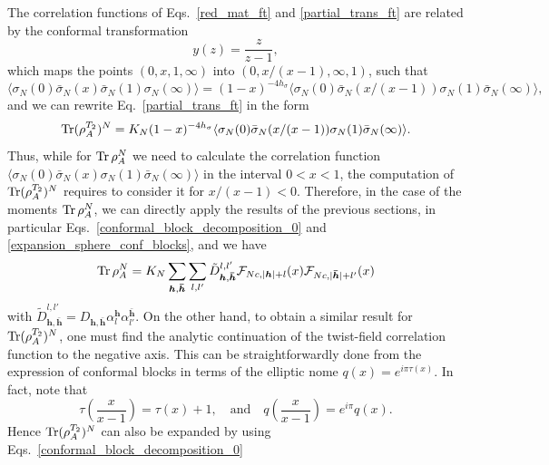 \documentclass[a4paper,11pt]{article}
\def\Tr{\mathop{\mbox{\normalfont Tr}}\nolimits}
\begin{document}
The correlation functions of Eqs.~\eqref{red_mat_ft} and \eqref{partial_trans_ft} are
related by the conformal transformation
\begin{equation}
 y(z)=\frac{z}{z-1},
\end{equation}
which maps the points $(0, x, 1, \infty)$ into $(0, x/(x-1), \infty, 1)$, such that
\begin{equation}
 \langle \sigma_N(0)\bar{\sigma}_N(x)\bar{\sigma}_N(1)\sigma_N(\infty)\rangle=
 (1-x)^{-4h_\sigma}\langle \sigma_N(0)\bar{\sigma}_N(x/(x-1))\sigma_N(1)\bar{\sigma}_N(\infty)\rangle,
\end{equation}
and we can rewrite Eq.~\eqref{partial_trans_ft} in the form 
\begin{equation}\label{partial_trans_ft_2}
 \Tr(\rho_A^{T_2})^N=K_N(1-x)^{-4h_\sigma}\langle \sigma_N(0)\bar{\sigma}_N(x/(x-1))\sigma_N(1)\bar{\sigma}_N(\infty)\rangle.
 \end{equation}
Thus, while for $\Tr\rho_A^N$ we need to calculate the correlation function 
$\langle\sigma_N(0)\bar{\sigma}_N(x)\sigma_N(1)\bar{\sigma}_N(\infty)\rangle$
in the interval $0<x<1$, the computation of $\Tr(\rho_A^{T_2})^N$ requires to consider it
for $x/(x-1)<0$. Therefore, in the case of the moments $\Tr\rho_A^N$, we can directly apply 
the results of the previous sections, in particular Eqs.~\eqref{conformal_block_decomposition_0}
and \eqref{expansion_sphere_conf_blocks}, and we have
\begin{equation}\label{red_mat_cb}
 \Tr\rho_A^N=K_N\sum_{\boldsymbol{h}, \boldsymbol{\bar{h}}}\sum_{l, l'} 
 \tilde{D}_{\boldsymbol{h}, \boldsymbol{\bar{h}}}^{l, l'} 
 \mathcal{F}_{Nc, |\boldsymbol{h}|+l}(x)\mathcal{F}_{Nc, |\boldsymbol{\bar{h}}|+l'}(x)
\end{equation}
with $\tilde{D}_{\boldsymbol{h}, \boldsymbol{\bar{h}}}^{l, l'}=D_{\boldsymbol{h}, 
\boldsymbol{\bar{h}}}\alpha_l^{\boldsymbol{h}}\alpha_{l'}^{\boldsymbol{\bar{h}}}.$
On the other hand, to obtain a similar result for $\Tr(\rho_A^{T_2})^N$, 
one must find the analytic continuation of the twist-field correlation function to 
the negative axis. This can be straightforwardly done from the expression of conformal 
blocks in terms of the elliptic nome $q(x)=e^{i\pi \tau(x)}$. In fact, note that
\begin{equation}\label{tau_p_1}
 \tau\left(\frac{x}{x-1}\right)=\tau(x)+1, \quad \text{and} \quad 
 q\left(\frac{x}{x-1}\right)=e^{i\pi} q(x).
\end{equation}
Hence $\Tr(\rho_A^{T_2})^N$ can also be expanded by using Eqs.~\eqref{conformal_block_decomposition_0} 
\end{document}
